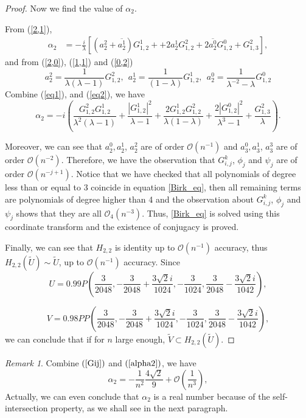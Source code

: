 \documentclass{article}
\numberwithin{figure}{section}
\numberwithin{equation}{section}
\theoremstyle{remark}
\newtheorem*{remark}{Remark}
\theoremstyle{definition}
\begin{document}
\begin{proof}
Now we find the value of $\alpha_2$.

From (\ref{2,1}),
\begin{align}\label{eq1}
\alpha_{2} &= -\frac{i}{\lambda}\left\lbrack \left( a_{2}^{2} + \overline{a_{2}^{1}} \right)G_{1,2}^{1}++2a_2^1G_{1,2}^2+2\overline{a_2^0}G_{1,2}^0  + G_{1,3}^{2} \right\rbrack,
\end{align}
and from (\ref{2,0}), (\ref{1,1}) and (\ref{0,2})
\begin{equation}\label{eq2}
 a_{2}^{2}=\frac{1}{\lambda( \lambda-1)}G_{1,2}^{2},\ \  a_{2}^{1}=\frac{1}{(1 - \lambda)}G_{1,2}^{1},\ \  a_{2}^{0}=\frac{1}{\lambda^{-2}-\lambda}G_{1,2}^{0}
\end{equation}
Combine (\ref{eq1}), and (\ref{eq2}), we have
\begin{equation}\label{alpha2}
\alpha_{2} = -i\left( \frac{G_{1,2}^{2}G_{1,2}^{1}}{\lambda^2( \lambda-1)} + \frac{\left|{G_{1,2}^{1}}\right|^{2}}{\lambda-1 } +\frac{2G_{1,2}^1G_{1,2}^2}{\lambda(1-\lambda)}+\frac{2\left|{G_{1,2}^{0}}\right|^{2}}{\lambda^3-1}+ \frac{G_{1,3}^{2}}{\lambda} \right).
\end{equation}

Moreover, we can see that $a_2^0,a_2^1$, $a_2^2$ are of order $\mathcal{O}(n^{-1})$ and $a_3^0,a_3^1$, $a_3^3$ are of order $\mathcal{O}(n^{-2})$. 
Therefore, we have the observation that $G_{i,j}^k$, $\phi_j$ and $\psi_j$ are of order $\mathcal{O}(n^{-j+1})$. Notice that we have checked that all polynomials of degree less than or equal to 3 coincide in equation \ref{Birk_eq}, then all remaining terms are polynomials of degree higher than 4 and the observation about $G_{i,j}^k$, $\phi_j$ and $\psi_j$ shows that they are all $\mathcal{O}_4\left(n^{-3}\right)$.
Thus, \ref{Birk_eq} is solved using this coordinate transform and the existence of conjugacy is proved.

Finally, we can see that $H_{2,2}$ is identity up to $\mathcal{O}(n^{-1})$ accuracy, thus $H_{2,2}(\widetilde{U})\sim \widetilde{U}$, up to $\mathcal{O}(n^{-1})$ accuracy. Since 
$$U=0.99P\left(	\frac{3}{2048},  -\frac{3}{2048}+\frac{3\sqrt{2}i}{1024}, -\frac{3}{1024},  \frac{3}{2048}-\frac{3\sqrt{2}i}{1042}\right),$$

$$V=0.98PP\left(	\frac{3}{2048},  -\frac{3}{2048}+\frac{3\sqrt{2}i}{1024}, -\frac{3}{1024},  \frac{3}{2048}-\frac{3\sqrt{2}i}{1042}\right),$$
we can conclude that if for $n$ large enough, $\widetilde{V}\subset H_{2,2}(\widetilde{U})$.

\end{proof}
\begin{remark}
	Combine $(\ref{Gij})$ and $(\ref{alpha2})$, we have
	$$\alpha_{2} = -\frac{1}{n^2}\frac{4\sqrt{2}}{9} +\mathcal{O}\left(\frac{1}{n^3}\right),$$ 
     Actually, we can even conclude that $\alpha_2$ is a real number because of the self-intersection property, as we shall see in the next paragraph.
\end{remark}
\end{document}

